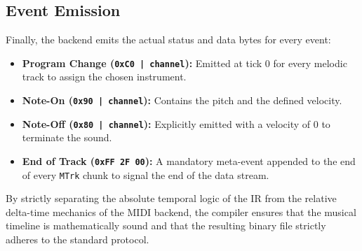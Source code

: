 \subsection{Event Emission}

Finally, the backend emits the actual status and data bytes for every event:
\begin{itemize}
  \item \textbf{Program Change (\texttt{0xC0 | channel}):} Emitted at tick 0 for every melodic track to
    assign the chosen instrument.
  \item \textbf{Note-On (\texttt{0x90 | channel}):} Contains the pitch and the defined velocity.
  \item \textbf{Note-Off (\texttt{0x80 | channel}):} Explicitly emitted with a velocity of 0 to terminate the sound.
  \item \textbf{End of Track (\texttt{0xFF 2F 00}):} A mandatory meta-event appended to the end of every
    \texttt{MTrk} chunk to signal the end of the data stream.
\end{itemize}

By strictly separating the absolute temporal logic of the IR from the relative delta-time mechanics of the
MIDI backend, the compiler ensures that the musical timeline is mathematically sound and that the resulting
binary file strictly adheres to the standard protocol.
